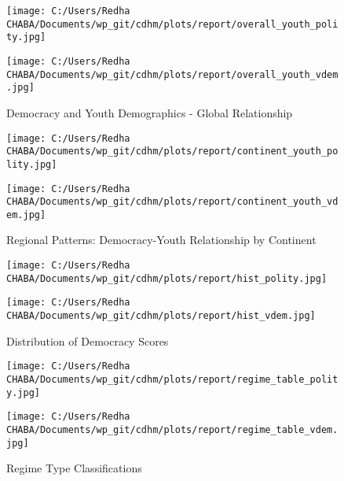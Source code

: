 \documentclass[11pt]{article}
\begin{document}
\begin{figure}[H]
    \begin{center}
    \caption{Democracy and Youth Demographics - Global Relationship}
    \texttt{[image: C:/Users/Redha CHABA/Documents/wp\_git/cdhm/plots/report/overall\_youth\_polity.jpg]}
    
    \vspace{1cm} 
    
    \texttt{[image: C:/Users/Redha CHABA/Documents/wp\_git/cdhm/plots/report/overall\_youth\_vdem.jpg]}
    \end{center}
\end{figure}

\begin{figure}[H]
    \begin{center}
    \caption{Regional Patterns: Democracy-Youth Relationship by Continent}
    \texttt{[image: C:/Users/Redha CHABA/Documents/wp\_git/cdhm/plots/report/continent\_youth\_polity.jpg]}
        
    \vspace{1cm}

    \texttt{[image: C:/Users/Redha CHABA/Documents/wp\_git/cdhm/plots/report/continent\_youth\_vdem.jpg]}
    \end{center}
\end{figure}

\begin{figure}[H]
    \begin{center}
    \caption{Distribution of Democracy Scores}
    \texttt{[image: C:/Users/Redha CHABA/Documents/wp\_git/cdhm/plots/report/hist\_polity.jpg]}
    
    \vspace{1cm}

    \texttt{[image: C:/Users/Redha CHABA/Documents/wp\_git/cdhm/plots/report/hist\_vdem.jpg]}
    \end{center}
\end{figure}

\begin{figure}[H]
    \begin{center}
    \caption{Regime Type Classifications}
    \texttt{[image: C:/Users/Redha CHABA/Documents/wp\_git/cdhm/plots/report/regime\_table\_polity.jpg]}
        
    \vspace{1cm}

    \texttt{[image: C:/Users/Redha CHABA/Documents/wp\_git/cdhm/plots/report/regime\_table\_vdem.jpg]}
    \end{center}
\end{figure}
\end{document}
